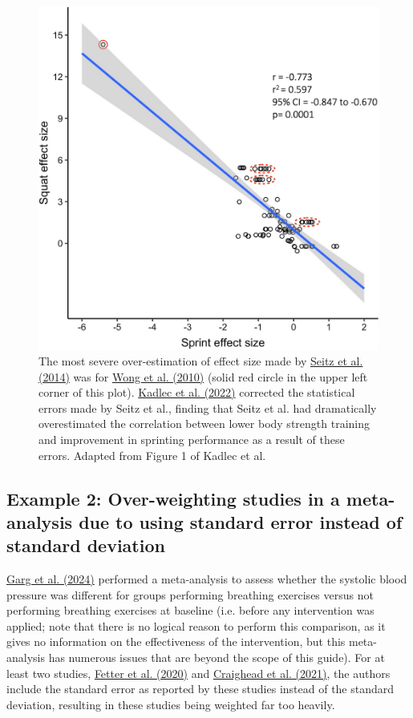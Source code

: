 \documentclass[letterpaper, 12pt]{article}
\begin{document}
\begin{figure}[h!tbp]
    \includegraphics[width=\textwidth]{img/sd_vs_se/kadlec_effect_size.png}
    \caption*{ The most severe over-estimation of effect size made by \href{https://doi.org/10.1007/s40279-014-0227-1}{Seitz et al. (2014)} was for \href{https://doi.org/10.1519/JSC.0b013e3181aa36a2}{Wong et al. (2010)} (solid red circle in the upper left corner of this plot). \href{https://doi.org/10.1007/s40279-022-01766-0}{Kadlec et al. (2022)} corrected the statistical errors made by Seitz et al., finding that Seitz et al. had dramatically overestimated the correlation between lower body strength training and improvement in sprinting performance as a result of these errors. Adapted from Figure 1 of Kadlec et al.}
\end{figure}

\pagebreak

\subsection*{Example 2: Over-weighting studies in a meta-analysis due to using standard error instead of standard deviation}

\href{https://doi.org/10.1016/j.ijcrp.2023.200232}{Garg et al. (2024)} performed a meta-analysis to assess whether the systolic blood pressure was different for groups performing breathing exercises versus not performing breathing exercises at baseline (i.e. before any intervention was applied; note that there is no logical reason to perform this comparison, as it gives no information on the effectiveness of the intervention, but this meta-analysis has numerous issues that are beyond the scope of this guide). For at least two studies, \href{https://doi.org/10.3389/fphys.2020.00898}{Fetter et al. (2020)} and \href{https://doi.org/10.1161/JAHA.121.020980}{Craighead et al. (2021)}, the authors include the standard error as reported by these studies instead of the standard deviation, resulting in these studies being weighted far too heavily.
\end{document}

